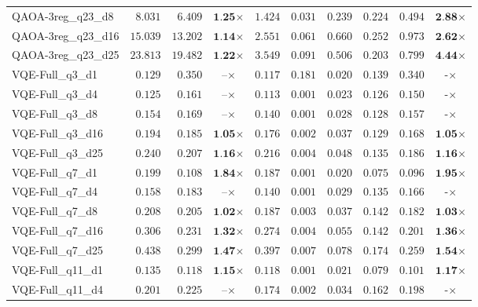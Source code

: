 \begin{table*}[t]
{\begin{tabular}{| l || r r c || r r r r r c |}
QAOA-3reg\_q23\_d8 & $8.031$ & $6.409$ & $\textbf{1.25}$$\times$ & $1.424$ & $0.031$ & $0.239$ & $0.224$ & $0.494$ & $\textbf{2.88}$$\times$ \\
QAOA-3reg\_q23\_d16 & $15.039$ & $13.202$ & $\textbf{1.14}$$\times$ & $2.551$ & $0.061$ & $0.660$ & $0.252$ & $0.973$ & $\textbf{2.62}$$\times$ \\
QAOA-3reg\_q23\_d25 & $23.813$ & $19.482$ & $\textbf{1.22}$$\times$ & $3.549$ & $0.091$ & $0.506$ & $0.203$ & $0.799$ & $\textbf{4.44}$$\times$ \\
VQE-Full\_q3\_d1 & $0.129$ & $0.350$ & $\textbf{--}$$\times$ & $0.117$ & $0.181$ & $0.020$ & $0.139$ & $0.340$ & $\textbf{-}$$\times$ \\
VQE-Full\_q3\_d4 & $0.125$ & $0.161$ & $\textbf{--}$$\times$ & $0.113$ & $0.001$ & $0.023$ & $0.126$ & $0.150$ & $\textbf{-}$$\times$ \\
VQE-Full\_q3\_d8 & $0.154$ & $0.169$ & $\textbf{--}$$\times$ & $0.140$ & $0.001$ & $0.028$ & $0.128$ & $0.157$ & $\textbf{-}$$\times$ \\
VQE-Full\_q3\_d16 & $0.194$ & $0.185$ & $\textbf{1.05}$$\times$ & $0.176$ & $0.002$ & $0.037$ & $0.129$ & $0.168$ & $\textbf{1.05}$$\times$ \\
VQE-Full\_q3\_d25 & $0.240$ & $0.207$ & $\textbf{1.16}$$\times$ & $0.216$ & $0.004$ & $0.048$ & $0.135$ & $0.186$ & $\textbf{1.16}$$\times$ \\
VQE-Full\_q7\_d1 & $0.199$ & $0.108$ & $\textbf{1.84}$$\times$ & $0.187$ & $0.001$ & $0.020$ & $0.075$ & $0.096$ & $\textbf{1.95}$$\times$ \\
VQE-Full\_q7\_d4 & $0.158$ & $0.183$ & $\textbf{--}$$\times$ & $0.140$ & $0.001$ & $0.029$ & $0.135$ & $0.166$ & $\textbf{-}$$\times$ \\
VQE-Full\_q7\_d8 & $0.208$ & $0.205$ & $\textbf{1.02}$$\times$ & $0.187$ & $0.003$ & $0.037$ & $0.142$ & $0.182$ & $\textbf{1.03}$$\times$ \\
VQE-Full\_q7\_d16 & $0.306$ & $0.231$ & $\textbf{1.32}$$\times$ & $0.274$ & $0.004$ & $0.055$ & $0.142$ & $0.201$ & $\textbf{1.36}$$\times$ \\
VQE-Full\_q7\_d25 & $0.438$ & $0.299$ & $\textbf{1.47}$$\times$ & $0.397$ & $0.007$ & $0.078$ & $0.174$ & $0.259$ & $\textbf{1.54}$$\times$ \\
VQE-Full\_q11\_d1 & $0.135$ & $0.118$ & $\textbf{1.15}$$\times$ & $0.118$ & $0.001$ & $0.021$ & $0.079$ & $0.101$ & $\textbf{1.17}$$\times$ \\
VQE-Full\_q11\_d4 & $0.201$ & $0.225$ & $\textbf{--}$$\times$ & $0.174$ & $0.002$ & $0.034$ & $0.162$ & $0.198$ & $\textbf{-}$$\times$ \\

\end{tabular}}
\end{table*}
